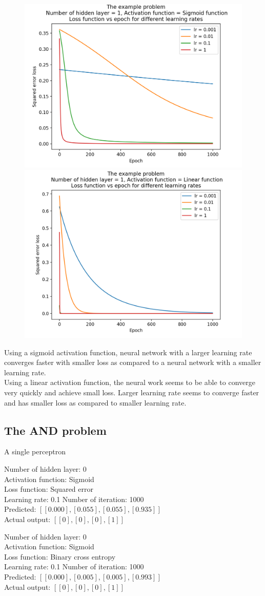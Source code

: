 \documentclass[12pt]{amsart}
\begin{document}
\begin{figure}[h]
\includegraphics[width=0.49\columnwidth]{example_sigmoid_mse_lrs.png}
\includegraphics[width=0.49\columnwidth]{example_linear_mse_lrs.png}
\end{figure}

Using a sigmoid activation function, neural network with a larger learning rate converges faster with smaller loss as compared to a neural network with a smaller learning rate. \\

Using a linear activation function, the neural work seems to be able to converge very quickly and achieve small loss. Larger learning rate seems to converge faster and has smaller loss as compared to smaller learning rate.

\vfill

\pagebreak
\subsection{The AND problem} A single perceptron\\
\begin{multicols}{2}
Number of hidden layer: 0 \\
Activation function: Sigmoid \\
Loss function: Squared error\\
Learning rate: 0.1
Number of iteration: 1000 \\
Predicted: $[[0.000], [0.055], [0.055], [0.935]] $ \\
Actual output: $[[0],[0],[0],[1]]$

Number of hidden layer: 0 \\
Activation function: Sigmoid \\
Loss function: Binary cross entropy\\
Learning rate: 0.1
Number of iteration: 1000 \\
Predicted: $[[0.000], [0.005], [0.005], [0.993]] $ \\
Actual output: $[[0],[0],[0],[1]]$
\end{multicols}
\end{document}
